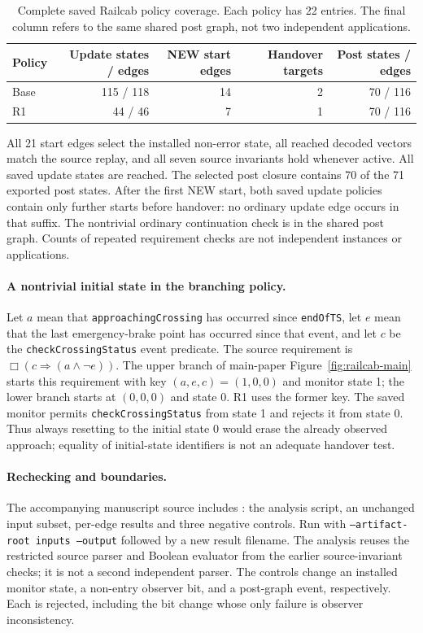 \begin{table}[!htbp]
\centering\small
\caption{Complete saved Railcab policy coverage. Each policy has 22 entries. The final column refers to the same shared post graph, not two independent applications.}
\label{tab:railcab-activation}
\begin{tabular}{@{}lrrrr@{}}\toprule
Policy & Update states / edges & NEW start edges & Handover targets & Post states / edges\\\midrule
Base & 115 / 118 & 14 & 2 & 70 / 116\\
R1 & 44 / 46 & 7 & 1 & 70 / 116\\\bottomrule
\end{tabular}
\end{table}

All 21 start edges select the installed non-error state, all reached decoded vectors match the source replay, and all seven source invariants hold whenever active. All saved update states are reached. The selected post closure contains 70 of the 71 exported post states. After the first NEW start, both saved update policies contain only further starts before handover: no ordinary update edge occurs in that suffix. The nontrivial ordinary continuation check is in the shared post graph. Counts of repeated requirement checks are not independent instances or applications.

\paragraph{A nontrivial initial state in the branching policy.}
Let $a$ mean that \texttt{approachingCrossing} has occurred since \texttt{endOfTS}, let $e$ mean that the last emergency-brake point has occurred since that event, and let $c$ be the \texttt{checkCrossingStatus} event predicate. The source requirement is $\Box(c\Rightarrow(a\land\neg e))$. The upper branch of main-paper Figure~\ref{fig:railcab-main} starts this requirement with key $(a,e,c)=(1,0,0)$ and monitor state 1; the lower branch starts at $(0,0,0)$ and state 0. R1 uses the former key. The saved monitor permits \texttt{checkCrossingStatus} from state 1 and rejects it from state 0. Thus always resetting to the initial state 0 would erase the already observed approach; equality of initial-state identifiers is not an adequate handover test.

\paragraph{Rechecking and boundaries.}
The accompanying manuscript source includes : the analysis script, an unchanged input subset, per-edge results and three negative controls. Run  with \texttt{--artifact-root inputs --output} followed by a new result filename. The analysis reuses the restricted source parser and Boolean evaluator from the earlier source-invariant checks; it is not a second independent parser. The controls change an installed monitor state, a non-entry observer bit, and a post-graph event, respectively. Each is rejected, including the bit change whose only failure is observer inconsistency.


